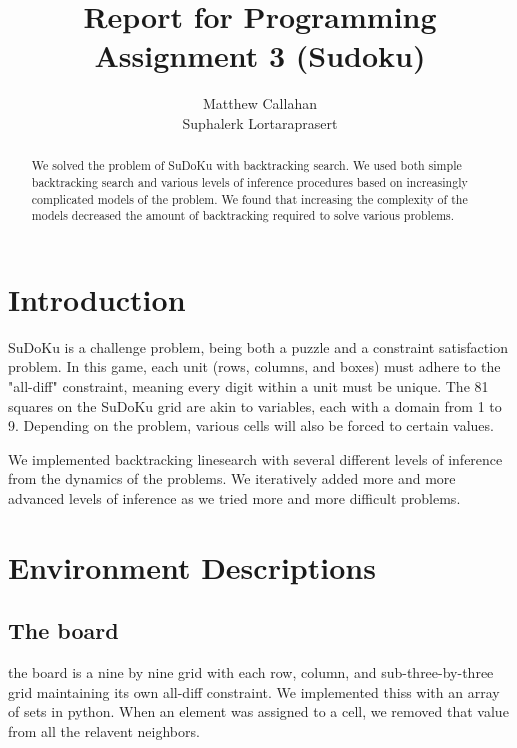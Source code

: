 \documentclass{article}
\title{Report for Programming Assignment 3 (Sudoku)}
\author{%
  Matthew Callahan\\
  \And
  Suphalerk Lortaraprasert
}
\begin{document}
\maketitle


\begin{abstract}
  We solved the problem of SuDoKu with backtracking search. We used both simple backtracking search and various levels of inference procedures based on increasingly complicated models of the problem. We found that increasing the complexity of the models decreased the amount of backtracking required to solve various problems. 
 \end{abstract}

\section{Introduction}
SuDoKu is a challenge problem, being both a puzzle and a constraint satisfaction problem. In this game, each unit (rows, columns, and boxes) must adhere to the "all-diff" constraint, meaning every digit within a unit must be unique. The 81 squares on the SuDoKu grid are akin to variables, each with a domain from 1 to 9. Depending on the problem, various cells will also be forced to certain values. 

We implemented backtracking linesearch with several different levels of inference from the dynamics of the problems.  We iteratively added more and more advanced levels of inference as we tried more and more difficult problems. 

  
\section{Environment Descriptions}
\subsection{The board}
the board is a nine by nine grid with each row, column, and sub-three-by-three grid maintaining its own all-diff constraint. We implemented thiss with an array of sets in python. When an element was assigned to a cell, we removed that value from all the relavent neighbors. 
\end{document}
